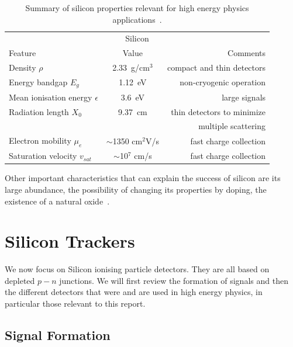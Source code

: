 \begin{table}[htbp]
   \centering
   \begin{tabular}{@{} lcr @{}} %
      \toprule
      \multicolumn{3}{c}{Silicon} \\
      \cmidrule(r){1-3} %
      Feature    & Value & Comments \\
      \midrule
      Density  $\rho$    & 2.33~g/cm${^3}$ & compact and thin detectors  \\
      Energy bandgap $E_g$ & 1.12~eV & non-cryogenic operation \\
      Mean ionisation energy $\epsilon$ & 3.6~eV & large signals\\
      Radiation length $X_0$      &  9.37~cm & thin detectors to minimize  \\
                                       &                 & multiple scattering \\
      Electron mobility  $\mu_e$     & $\sim$1350 cm$^2$V/s  & fast charge collection \\
      Saturation velocity $v_{sat}$ & $\sim$10$^{7}$ cm/s & fast charge collection \\
      \bottomrule
   \end{tabular}
   \caption{Summary of silicon properties relevant for high energy physics applications~\cite{Lutz:411172}.}
   \label{tab:SiProperties}
\end{table}

Other important characteristics that can explain the success of silicon are its large abundance, 
the possibility of changing its properties by doping, the existence of a natural oxide~\cite{Hartmann2012}.

\section{Silicon Trackers}
\label{sec:Trackers}
We now focus on Silicon ionising particle detectors. They are all based on depleted $p-n$ junctions.  
We will first review the formation of signals and then the different detectors that were and are used 
in high energy physics, in particular those relevant to this report.

\subsection{Signal Formation}
\label{sec:SigForm}

